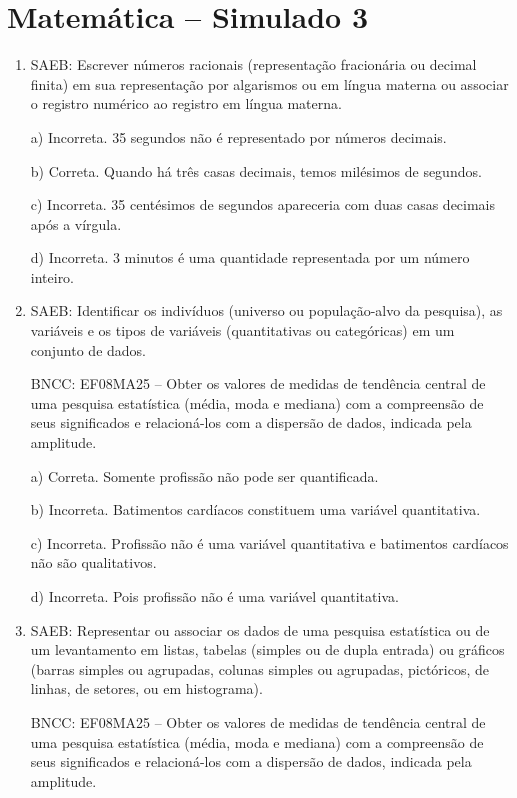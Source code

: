 \section*{Matemática – Simulado 3}

\begin{enumerate}
\item SAEB: Escrever números racionais (representação fracionária ou decimal
finita) em sua representação por algarismos ou em língua materna ou
associar o registro numérico ao registro em língua materna.

a) Incorreta. 35 segundos não é representado por números decimais.

b) Correta. Quando há três casas decimais, temos milésimos de
segundos.

c) Incorreta. 35 centésimos de segundos apareceria com duas casas
decimais após a vírgula.

d) Incorreta. 3 minutos é uma quantidade representada por um número
inteiro.

\item SAEB: Identificar os indivíduos (universo ou população-alvo da
pesquisa), as variáveis e os tipos de variáveis (quantitativas ou
categóricas) em um conjunto de dados.

BNCC: EF08MA25 -- Obter os valores de medidas de tendência central de
uma pesquisa estatística (média, moda e mediana) com a compreensão de
seus significados e relacioná-los com a dispersão de dados, indicada
pela amplitude.

a) Correta. Somente profissão não pode ser quantificada.

b) Incorreta. Batimentos cardíacos constituem uma variável
quantitativa.

c) Incorreta. Profissão não é uma variável quantitativa e
batimentos cardíacos não são qualitativos.

d) Incorreta. Pois profissão não é uma variável quantitativa.

\item SAEB: Representar ou associar os dados de uma pesquisa estatística ou de
um levantamento em listas, tabelas (simples ou de dupla entrada) ou
gráficos (barras simples ou agrupadas, colunas simples ou agrupadas,
pictóricos, de linhas, de setores, ou em histograma).

BNCC: EF08MA25 -- Obter os valores de medidas de tendência central de
uma pesquisa estatística (média, moda e mediana) com a compreensão de
seus significados e relacioná-los com a dispersão de dados, indicada
pela amplitude.


\end{enumerate}

